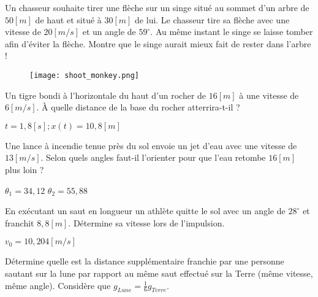 \begin{exercise}
    Un chasseur souhaite tirer une flèche sur un singe situé au sommet d'un arbre de \(50[m]\) de haut et situé à \(30[m]\) de lui. Le chasseur tire sa flèche avec une vitesse de \(20\unit{[m/s]}\) et un angle de \(59^{\circ}\). Au même instant le singe se laisse tomber afin d'éviter la flèche. Montre que le singe aurait mieux fait de rester dans l'arbre !
    \begin{figure}[h!]
        \centering
        \texttt{[image: shoot\_monkey.png]}
    \end{figure}
\end{exercise}


\begin{exercise}
    Un tigre bondi à l'horizontale du haut d'un rocher de \(16[m]\) à une vitesse de \(6\unit{[m/s]}\). À quelle distance de la base du rocher atterrira-t-il ?
\end{exercise}
\begin{solution}
    \(t=1,8[s] ; x(t)=10,8[m]\)
\end{solution}

\begin{exercise}
    Une lance à incendie tenue près du sol envoie un jet d'eau avec une vitesse de \(13\unit{[m/s]}\). Selon quels angles faut-il l'orienter pour que l'eau retombe \(16[m]\) plus loin ?
\end{exercise}
\begin{solution}
    \(\theta _1 = 34,12 \)
    \(\theta _2 = 55,88 \)
\end{solution}

\begin{exercise}
\end{exercise}

\begin{exercise}
    En exécutant un saut en longueur un athlète quitte le sol avec un angle de \(28^{\circ}\) et franchit \(8,8[m]\). Détermine sa vitesse lors de l'impulsion.
\end{exercise}
\begin{solution}
    \(v_0=10,204\unit{[m/s]} \)
\end{solution}


\begin{exercise}
    Détermine quelle est la distance supplémentaire franchie par une personne sautant sur la lune par rapport au même saut effectué sur la Terre (même vitesse, même angle). Considère que \(g_{Lune}=\frac{1}{6} g_{Terre}\).
\end{exercise}



